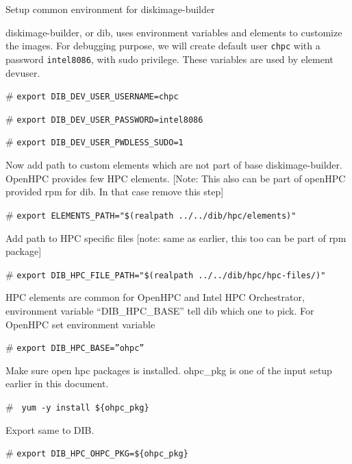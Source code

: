 \documentclass[12pt]{article}
\begin{document}
Setup common environment for diskimage-builder

diskimage-builder, or dib, uses environment variables and elements to customize the images. For debugging purpose, we will create default user \texttt{chpc} with a password \texttt{intel8086}, with sudo privilege. These variables are used by element devuser. 

\begin{bash}[ctrlr]\# \texttt{\small{export DIB\_DEV\_USER\_USERNAME=chpc}}\end{bash}
\begin{bash}[ctrlr]\# \texttt{\small{export DIB\_DEV\_USER\_PASSWORD=intel8086}}\end{bash}
\begin{bash}[ctrlr]\# \texttt{\small{export DIB\_DEV\_USER\_PWDLESS\_SUDO=1}}\end{bash}

Now add path to custom elements which are not part of base diskimage-builder. OpenHPC provides few HPC elements. [Note: This also can be part of openHPC provided rpm for dib. In that case remove this step]

\begin{bash}[ctrlr]\# \texttt{\small{export ELEMENTS\_PATH="\$(realpath ../../dib/hpc/elements)"}}\end{bash}

Add path to HPC specific files [note: same as earlier, this too can be part of rpm package]

\begin{bash}[ctrlr]\# \texttt{\small{export DIB\_HPC\_FILE\_PATH="\$(realpath ../../dib/hpc/hpc-files/)"}}\end{bash}

HPC elements are common for OpenHPC and Intel HPC Orchestrator, environment variable “DIB\_HPC\_BASE” tell dib which one to pick. For OpenHPC set environment variable

\begin{bash}[ctrlr]\# \texttt{\small{export DIB\_HPC\_BASE=”ohpc”}}\end{bash}

Make sure open hpc packages is installed. ohpc\_pkg is one of the input setup earlier in this document.

\begin{bash}[ctrlr]\# \texttt{\small{ yum -y install \$\{ohpc\_pkg\}}}\end{bash}

Export same to DIB.

\begin{bash}[ctrlr]\# \texttt{\small{export DIB\_HPC\_OHPC\_PKG=\$\{ohpc\_pkg\}}}\end{bash}
\end{document}
